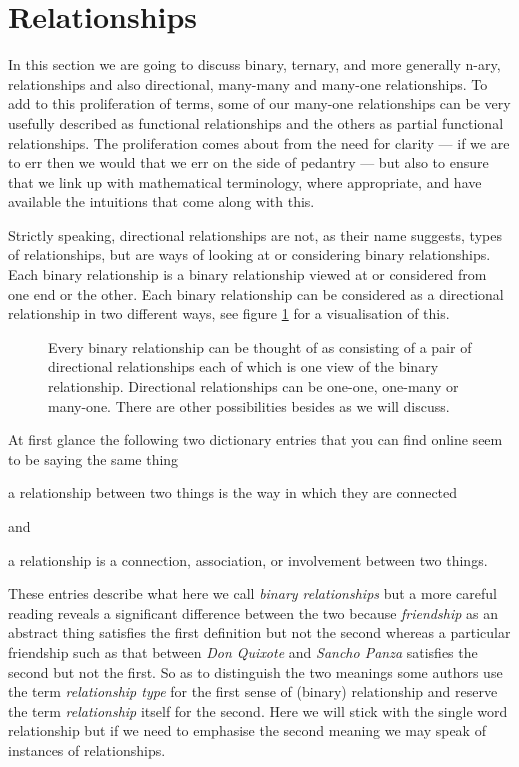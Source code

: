 \section{Relationships}
\mynote
In this section we are going to discuss binary, ternary, and more generally n-ary, relationships and also  directional, many-many and many-one relationships. To add to this proliferation of terms, some of our many-one relationships can be very usefully described as functional relationships and the others as partial functional relationships. 	The proliferation comes about from the need for clarity --- if we are to err then we would that we err on the side of pedantry --- but also to ensure that we link up with mathematical terminology, where appropriate, and have available the intuitions that come along with this.

\mynote Strictly speaking, directional relationships are not, as their name suggests, types of relationships, but are ways of looking at or considering binary relationships. Each binary relationship is a binary relationship viewed at or considered from one end or the other. Each binary relationship can be considered as a directional relationship in two different ways, see figure \ref{relationshipTerminology} for a visualisation of this.

\begin{figure}
\label{relationshipTerminology}

\caption{Every binary relationship can be thought of as consisting of a pair of directional relationships each of which is one view of the binary relationship. Directional relationships can be one-one, one-many or many-one. There are other possibilities besides as we will discuss.  }
\end{figure}

\mynote 
At first glance the following two dictionary entries that you can find online seem to be saying the same thing
\begin{erquote}
a relationship between two things is the way in which they are connected
\end{erquote}
and 
\begin{erquote}
a relationship is a connection, association, or involvement between two things.
\end{erquote}
These entries describe what here we call \textit{binary relationships} but
a more careful reading reveals a significant difference between the two because \textit{friendship} as an abstract thing satisfies the first definition but not the second whereas a particular friendship such as that between \textit{Don Quixote} and \textit{Sancho Panza} satisfies the second  but not the first. 
So as to distinguish the two meanings some authors use the term \textit{relationship type} for the first sense of (binary) relationship and reserve the term \textit{relationship} itself for the second. Here we will stick with the single word relationship but if we need to emphasise the second meaning we may speak of instances of relationships. 

